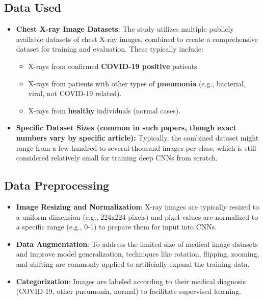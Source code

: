 \subsection*{Data Used}
\begin{itemize}
    \item \textbf{Chest X-ray Image Datasets}: The study utilizes multiple publicly available datasets of chest X-ray images, combined to create a comprehensive dataset for training and evaluation. These typically include:
    \begin{itemize}
        \item X-rays from confirmed \textbf{COVID-19 positive} patients.
        \item X-rays from patients with other types of \textbf{pneumonia} (e.g., bacterial, viral, not COVID-19 related).
        \item X-rays from \textbf{healthy} individuals (normal cases).
    \end{itemize}
    \item \textbf{Specific Dataset Sizes (common in such papers, though exact numbers vary by specific article):} Typically, the combined dataset might range from a few hundred to several thousand images per class, which is still considered relatively small for training deep CNNs from scratch.
\end{itemize}

\subsection*{Data Preprocessing}
\begin{itemize}
    \item \textbf{Image Resizing and Normalization}: X-ray images are typically resized to a uniform dimension (e.g., 224x224 pixels) and pixel values are normalized to a specific range (e.g., 0-1) to prepare them for input into CNNs.
    \item \textbf{Data Augmentation}: To address the limited size of medical image datasets and improve model generalization, techniques like rotation, flipping, zooming, and shifting are commonly applied to artificially expand the training data.
    \item \textbf{Categorization}: Images are labeled according to their medical diagnosis (COVID-19, other pneumonia, normal) to facilitate supervised learning.
\end{itemize}


